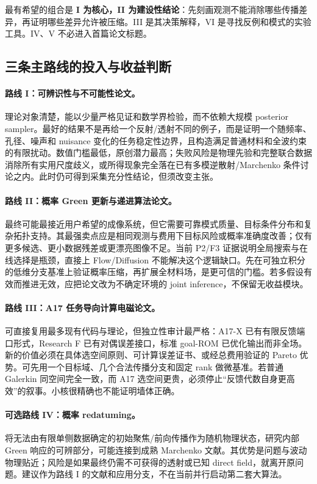 最有希望的组合是 \textbf{I 为核心，II 为建设性结论}：先刻画观测不能消除哪些传播差异，再证明哪些差异允许被压缩。III 是其决策解释，VI 是寻找反例和模式的实验工具。IV、V 不必进入首篇论文标题。

\subsection{三条主路线的投入与收益判断}
\paragraph{路线 I：可辨识性与不可能性论文。}
理论对象清楚，能以少量严格见证和数学界检验，而不依赖大规模 posterior sampler。最好的结果不是再给一个反射/透射不同的例子，而是证明一个随频率、孔径、噪声和 nuisance 变化的任务稳定性边界，且构造满足普通材料和全波约束的有限扰动。数值门槛最低，原创潜力最高；失败风险是物理先验和完整联合数据消除所有实用尺度歧义，或所得现象完全落在已有多模逆散射/Marchenko 条件讨论之内。此时仍可得到采集充分性结论，但须改变主张。

\paragraph{路线 II：概率 Green 更新与递进算法论文。}
最终可能最接近用户希望的成像系统，但它需要可靠模式质量、目标条件分布和复杂拓扑支持。其最强卖点应是相同观测与费用下目标风险或概率准确度改善；仅有更多候选、更小数据残差或更漂亮图像不足。当前 P2/F3 证据说明全局搜索与在线选择是瓶颈，直接上 Flow/Diffusion 不能解决这个逻辑缺口。先在可独立积分的低维分支基准上验证概率压缩，再扩展全材料场，是更可信的门槛。若多假设有效而推进无效，应把论文改为不确定环境的 joint inference，不保留无收益模块。

\paragraph{路线 III：A17 任务导向计算电磁论文。}
可直接复用最多现有代码与理论，但独立性审计最严格：A17-X 已有有限反馈端口形式，Research F 已有对偶误差接口，标准 goal-ROM 已优化输出而非全场。新的价值必须在具体选空间原则、可计算误差证书、或经总费用验证的 Pareto 优势。可先用一个目标域、几个合法传播分支和固定 rank 做微基准。若普通 Galerkin 同空间完全一致，而 A17 选空间更贵，必须停止“反馈代数自身更高效”的叙事。小核很精确也不能证明墙体正确。

\paragraph{可选路线 IV：概率 redatuming。}
将无法由有限单侧数据确定的初始聚焦/前向传播作为随机物理状态，研究内部 Green 响应的可辨部分，可能连接到成熟 Marchenko 文献。其优势是问题与波动物理贴近；风险是如果最终仍需不可获得的透射或已知 direct field，就离开原问题。建议作为路线 I 的文献和应用分支，不在当前并行启动第二套大算法。

